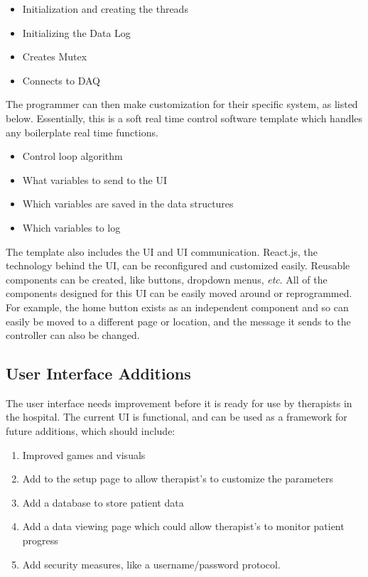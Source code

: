 \documentclass[12pt]{report}
\begin{document}
	\begin{itemize}
		\item Initialization and creating the threads
		\item Initializing the Data Log
		\item Creates Mutex
		\item Connects to DAQ
	\end{itemize}
	
	The programmer can then make customization for their specific system, as listed below. Essentially, this is a soft real time control software template which handles any boilerplate real time functions.
	
	\begin{itemize}
		\item Control loop algorithm
		\item What variables to send to the UI
		\item Which variables are saved in the data structures 
		\item Which variables to log 
	\end{itemize}
	
	The template also includes the UI and UI communication. React.js, the technology behind the UI, can be reconfigured and customized easily. Reusable components can be created, like buttons, dropdown menus, \textit{etc}. All of the components designed for this UI can be easily moved around or reprogrammed. For example, the home button exists as an independent component and so can easily be moved to a different page or location, and the message it sends to the controller can also be changed. 	
	
	\subsection{User Interface Additions}
	
The user interface needs improvement before it is ready for use by therapists in the hospital. The current UI is functional, and can be used as a framework for future additions, which should include: 	
	
	\begin{enumerate}
		\item Improved games and visuals
		\item Add to the setup page to allow therapist's to customize the parameters
		\item Add a database to store patient data
		\item Add a data viewing page which could allow therapist's to monitor patient progress
		\item Add security measures, like a username/password protocol.  
	\end{enumerate}
	
\end{document}
